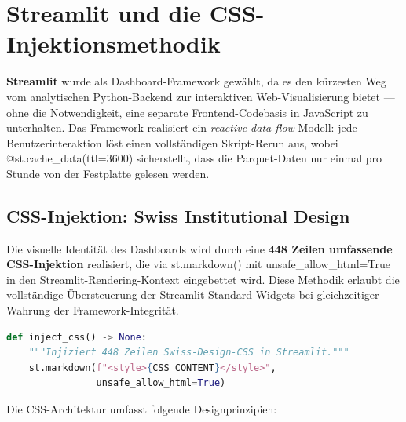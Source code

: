 \documentclass[11pt, a4paper, oneside, openany]{report}
\newcommand{\code}[1]{{\codefont\small\textcolor{DeepNavy}{#1}}}
\begin{document}
\section{Streamlit und die CSS-Injektionsmethodik}
\label{sec:streamlit}

\textbf{Streamlit} wurde als Dashboard-Framework gewählt, da es den kürzesten Weg vom analytischen Python-Backend zur interaktiven Web-Visualisierung bietet --- ohne die Notwendigkeit, eine separate Frontend-Codebasis in JavaScript zu unterhalten. Das Framework realisiert ein \textit{reactive data flow}-Modell: jede Benutzerinteraktion löst einen vollständigen Skript-Rerun aus, wobei \code{@st.cache\_data(ttl=3600)} sicherstellt, dass die Parquet-Daten nur einmal pro Stunde von der Festplatte gelesen werden.

\subsection{CSS-Injektion: Swiss Institutional Design}

Die visuelle Identität des Dashboards wird durch eine \textbf{448 Zeilen umfassende CSS-Injektion} realisiert, die via \code{st.markdown()} mit \code{unsafe\_allow\_html=True} in den Streamlit-Rendering-Kontext eingebettet wird. Diese Methodik erlaubt die vollständige Übersteuerung der Streamlit-Standard-Widgets bei gleichzeitiger Wahrung der Framework-Integrität.

\begin{lstlisting}[language=Python, caption={CSS-Injektionsmuster (vereinfacht)}]
def inject_css() -> None:
    """Injiziert 448 Zeilen Swiss-Design-CSS in Streamlit."""
    st.markdown(f"<style>{CSS_CONTENT}</style>",
                unsafe_allow_html=True)
\end{lstlisting}

\noindent Die CSS-Architektur umfasst folgende Designprinzipien:
\end{document}
